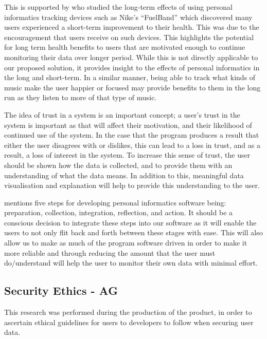\documentclass[10pt, notitlepage]{report}
\begin{document}
This is supported by \cite{Fritz2014} who studied the long-term effects of using personal informatics tracking devices such as Nike’s “FuelBand” which discovered many users experienced a short-term improvement to their health. This was due to the encouragement that users receive on such devices. This highlights the potential for long term health benefits to users that are motivated enough to continue monitoring their data over longer period. While this is not directly applicable to our proposed solution, it provides insight to the effects of personal informatics in the long and short-term. In a similar manner, being able to track what kinds of music make the user happier or focused may provide benefits to them in the long run as they listen to more of that type of music.

The idea of trust in a system is an important concept; a user’s trust in the system is important as that will affect their motivation, and their likelihood of continued use of the system. In the case that the program produces a result that either the user disagrees with or dislikes, this can lead to a loss in trust, and as a result, a loss of interest in the system. To increase this sense of trust, the user should be shown how the data is collected, and to provide them with an understanding of what the data means. In addition to this, meaningful data visualisation and explanation will help to provide this understanding to the user. \cite{Jaimes2013}

\cite{Li2010} mentions five steps for developing personal informatics software being: preparation, collection, integration, reflection, and action.  It should be a conscious decision to integrate these steps into our software as it will enable the users to not only flit back and forth between these stages with ease. This will also allow us to make as much of the program software driven in order to make it more reliable and through reducing the amount that the user must do/understand will help the user to monitor their own data with minimal effort.

\subsection{Security Ethics - AG}
\label{res:secethics}

This research was performed during the production of the product, in order to ascertain ethical guidelines for users to developers to follow when securing user data.\newline
\end{document}
